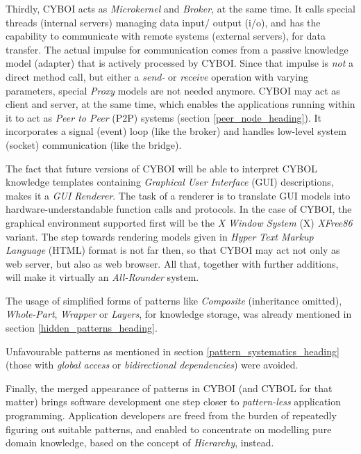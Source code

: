 Thirdly, CYBOI acts as \emph{Microkernel} and \emph{Broker}, at the same time.
It calls special threads (internal servers) managing data input/ output (i/o),
and has the capability to communicate with remote systems (external servers),
for data transfer. The actual impulse for communication comes from a passive
knowledge model (adapter) that is actively processed by CYBOI. Since that
impulse is \emph{not} a direct method call, but either a \emph{send-} or
\emph{receive} operation with varying parameters, special \emph{Proxy} models
are not needed anymore. CYBOI may act as client and server, at the same time,
which enables the applications running within it to act as \emph{Peer to Peer}
(P2P) systems (section \ref{peer_node_heading}). It incorporates a signal
(event) loop (like the broker) and handles low-level system (socket)
communication (like the bridge).

The fact that future versions of CYBOI will be able to interpret CYBOL
knowledge templates containing \emph{Graphical User Interface} (GUI)
descriptions, makes it a \emph{GUI Renderer}. The task of a renderer is to
translate GUI models into hardware-understandable function calls and protocols.
In the case of CYBOI, the
graphical environment supported first will be the \emph{X Window System} (X)
\emph{XFree86} \cite{xfree86} variant. The step towards rendering models given
in \emph{Hyper Text Markup Language} (HTML) format is not far then, so that
CYBOI may act not only as web server, but also as web browser. All that,
together with further additions, will make it virtually an \emph{All-Rounder}
system.

The usage of simplified forms of patterns like \emph{Composite} (inheritance
omitted), \emph{Whole-Part}, \emph{Wrapper} or \emph{Layers}, for knowledge
storage, was already mentioned in section \ref{hidden_patterns_heading}.

Unfavourable patterns as mentioned in section \ref{pattern_systematics_heading}
(those with \emph{global access} or \emph{bidirectional dependencies}) were
avoided.

Finally, the merged appearance of patterns in CYBOI (and CYBOL for that matter)
brings software development one step closer to \emph{pattern-less} application
programming. Application developers are freed from the burden of repeatedly
figuring out suitable patterns, and enabled to concentrate on modelling pure
domain knowledge, based on the concept of \emph{Hierarchy}, instead.
